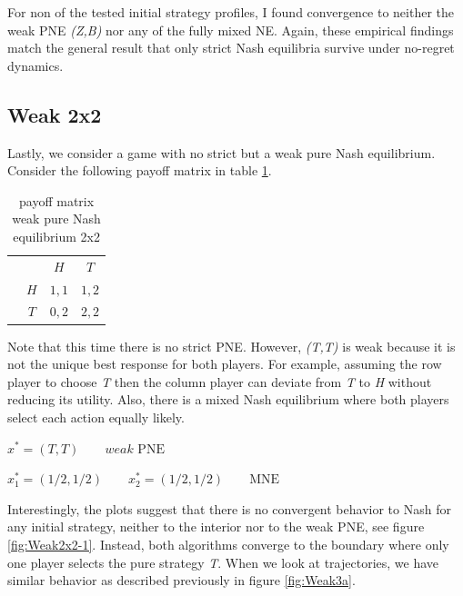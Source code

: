 For non of the tested initial strategy profiles, I found convergence to neither the weak PNE \textit{(Z,B)} nor any of the fully mixed NE. Again, these empirical findings match the general result that only strict Nash equilibria survive under no-regret dynamics.  

\subsection{Weak 2x2}\label{subsection:Weak 2x2}

Lastly, we consider a game with no strict but a weak pure Nash equilibrium. Consider the following payoff matrix in table \ref{tab:payoffWeak2x2}. 

\begin{table}[H]\centering
\setlength{\extrarowheight}{2pt}
\begin{tabular}{cc|c|c|}
  & \multicolumn{1}{c}{} & \multicolumn{1}{c}{$H$}  & \multicolumn{1}{c}{$T$} \\\cline{3-4}
  & $H$ & $1,1$ & $1,2$ \\\cline{3-4}
  & $T$ & $0,2$ & $2,2$ \\\cline{3-4}
\end{tabular}\caption{\label{tab:payoffWeak2x2}payoff matrix weak pure Nash equilibrium 2x2}
\end{table}

Note that this time there is no strict PNE. However, \textit{(T,T)} is weak because it is not the unique best response for both players. For example, assuming the row player to choose \textit{T} then the column player can deviate from \textit{T} to \textit{H} without reducing its utility. Also, there is a mixed Nash equilibrium where both players select each action equally likely. 

\begin{description}\centering
    \item $x^{*} = (T,T) \qquad \textit{weak }\text{PNE}$
    \item $x_{1}^* = (1/2,1/2) \qquad x_{2}^* = (1/2,1/2) \qquad \text{MNE}$
\end{description}

Interestingly, the plots suggest that there is no convergent behavior to Nash for any initial strategy, neither to the interior nor to the weak PNE, see figure \ref{fig:Weak2x2-1}. Instead, both algorithms converge to the boundary where only one player selects the pure strategy \textit{T}. When we look at trajectories, we have similar behavior as described previously in figure \ref{fig:Weak3a}. 

